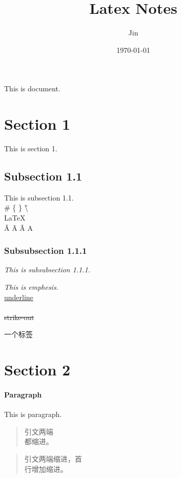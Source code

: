 \documentclass{article}
\title{Latex Notes}
\author{Jin}
\date{\today}
\begin{document}
\maketitle
\tableofcontents %

This is document.
\section{Section 1}
\Large{This} \small{is} section 1.

\subsection{Subsection 1.1}
This is subsection 1.1. \\
\# \{ \} \~ \textbackslash \\
\LaTeX \\
\v{A} \={A} \~{A} \textcircled{A}

\subsubsection{Subsubsection 1.1.1}
\textit{This is subsubsection 1.1.1.}  
\begin{spacing}{1.3}
    \emph{This is emphesis.} \\
    \uline{underline} \\
     \\
    \sout{strike-out}
\end{spacing}

一个标签\label{marker}


\newpage
\section{Section 2}

\paragraph{Paragraph}

\begin{flushleft}
    This is paragraph.
\end{flushleft}
\begin{quote}
引文两端\\都缩进。
\end{quote}

\begin{quotation}
引文两端缩进，首\\行增加缩进。
\end{quotation}
\end{document}
